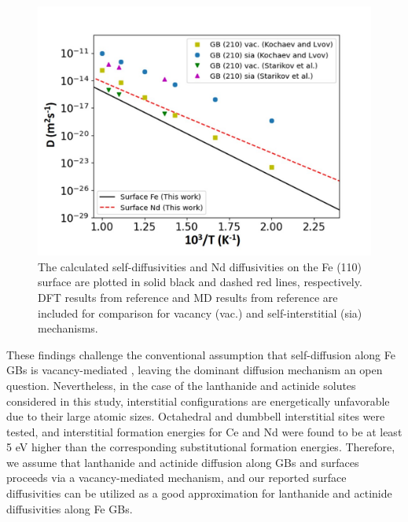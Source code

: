 \documentclass[preprint,12pt]{elsarticle}
\begin{document}
\begin{figure}[!ht]
    \centering
    \includegraphics[width=0.8\linewidth]{surface_diff_sim.jpg}
    \caption{The calculated self-diffusivities and Nd diffusivities on the Fe (110) surface are plotted in solid black and dashed red lines, respectively. DFT results from reference \cite{kochaev_anisotropic_2023} and MD results from reference \cite{starikov2020study} are included for comparison for vacancy (vac.) and self-interstitial (sia) mechanisms.}
    \label{fig:surf_diff_simulations}
\end{figure}

These findings challenge the conventional assumption that self-diffusion along Fe GBs is vacancy-mediated \cite{balluffi1982grain, peterson1983grain, klotsman1990impurity, kwok1981}, leaving the dominant diffusion mechanism an open question. Nevertheless, in the case of the lanthanide and actinide solutes considered in this study, interstitial configurations are energetically unfavorable due to their large atomic sizes. Octahedral and dumbbell interstitial sites were tested, and interstitial formation energies for Ce and Nd were found to be at least 5 eV higher than the corresponding substitutional formation energies. Therefore, we assume that lanthanide and actinide diffusion along GBs and surfaces proceeds via a vacancy-mediated mechanism, and our reported surface diffusivities can be utilized as a good approximation for lanthanide and actinide diffusivities along Fe GBs.


\end{document}
